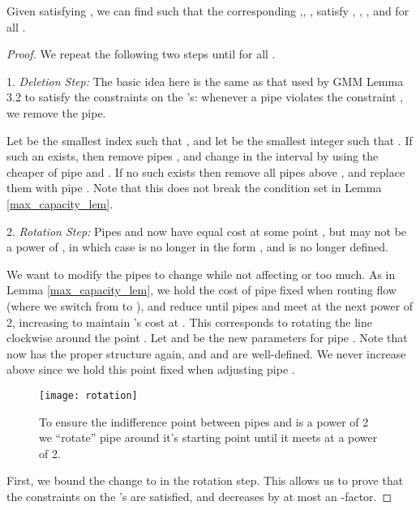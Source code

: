 \documentclass[11pt]{article}
\begin{document}
\begin{thm_delta} 
Given  satisfying , we can find  
such that the corresponding ,, ,  satisfy
, , , and  for all .
\end{thm_delta}

\begin{proof}
We repeat the following two steps until  for all .
\begin{description}
\item{1. \emph{Deletion Step:}} 
The basic idea here is the same as that used by GMM Lemma 3.2 \cite{guha2001cfa} to satisfy the constraints on the 's: whenever a pipe violates the constraint , we remove the pipe.

Let  be the smallest index such that , and let  be the smallest 
integer such that .  If such an  exists, then remove 
pipes , and change  in the interval  by using the cheaper of pipe  and 
.  If no such  exists then remove all pipes above , and replace them with pipe .
Note that this does not break the condition set in Lemma \ref{max_capacity_lem}.

\item{2. \emph{Rotation Step:}}
Pipes  and  now have equal cost at some point , but  may not be a power of , in which case  is no longer in the form , and  is no longer defined.  

We want to modify the pipes to change  while not affecting  or  too much.
As in Lemma \ref{max_capacity_lem}, we hold the cost of pipe  fixed when routing  flow (where we switch from  to ),
and reduce  until pipes  and  meet at the next power of 2, increasing  to maintain 's cost at .
This corresponds to rotating the line  clockwise around the point .  Let  and  be the new parameters for pipe .  
Note that  now has the proper structure again, and  and  are well-defined. We never increase  above  since we hold this point fixed when adjusting pipe .
\end{description}


\begin{figure}[htbp] 
 \centering
 \texttt{[image: rotation]} 
 \caption{To ensure the indifference point between pipes  and  is a power of 2 we ``rotate'' pipe  around it's starting point until it meets  at a power of 2.   }
 \label{rotation_fig}
\end{figure}

First, we bound the change to  in the rotation step.
This allows us to prove that the constraints on the 's are satisfied, and  decreases by at most an -factor.


\end{proof}
\end{document}
